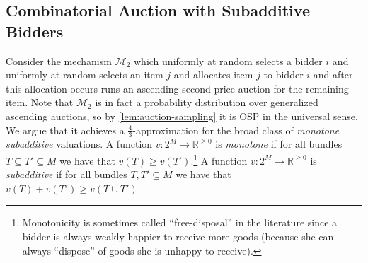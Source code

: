 \subsection{Combinatorial Auction with Subadditive Bidders}\label{subsec:22-ca-subadd}
Consider the mechanism $\mathcal{M}_2$ which uniformly at random selects a bidder $i$ and uniformly at random selects an item $j$ and allocates item $j$ to bidder $i$ and after this allocation occurs runs an ascending second-price auction for the remaining item.  Note that $\mathcal M_2$ is in fact a probability distribution over generalized ascending auctions, so by \cref{lem:auction-sampling} it is OSP in the universal sense.
We argue that it achieves a $\frac 4 3$-approximation for the broad class of \emph{monotone subadditive} valuations.  A function
$v:2^M\to \mathbb{R}^{\geq 0}$ is \emph{monotone} if for all bundles $T \subseteq T' \subseteq M$ we have that $v(T) \geq v(T')$.\footnote{Monotonicity is sometimes called ``free-disposal'' in the literature since a bidder is always weakly happier to receive more goods (because she can always ``dispose'' of goods she is unhappy to receive).}  A function $v:2^M\to \mathbb{R}^{\geq 0}$
is \emph{subadditive}  if for all bundles $T, T' \subseteq M$ we have that $v(T) + v(T') \geq v(T \cup T')$. 

